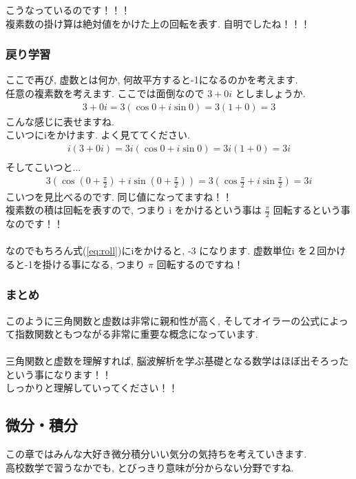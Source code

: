 \documentclass[11pt,a4paper]{jsarticle}
\begin{document}
こうなっているのです！！！\\
複素数の掛け算は絶対値をかけた上の回転を表す. 自明でしたね！！！
\subsubsection{戻り学習}
ここで再び, 虚数とは何か, 何故平方すると-1になるのかを考えます.\\
任意の複素数を考えます. ここでは面倒なので $ 3 + 0i$ としましょうか.
\begin{eqnarray}
3 + 0i = 3(\cos 0 + i\sin 0) = 3(1 + 0) = 3
\end{eqnarray}
こんな感じに表せますね.\\
こいつにiをかけます. よく見ててください.
\begin{eqnarray}
i(3 + 0i) = 3i(\cos 0 + i\sin 0) = 3i(1+0) = 3i\\
\end{eqnarray}
そしてこいつと...
\begin{eqnarray}
3(\cos (0+\frac{\pi}{2}) + i\sin (0 + \frac{\pi}{2})) = 3(\cos\frac{\pi}{2} + i\sin\frac{\pi}{2}) = 3i
\label{eq:roll}
\end{eqnarray}
こいつを見比べるのです. 同じ値になってますね！！\\
複素数の積は回転を表すので, つまり i をかけるという事は $\frac{\pi}{2}$ 回転するという事なのです！！\\
\\
なのでもちろん式(\ref{eq:roll})にiをかけると, -3 になります. 虚数単位i を２回かけると-1を掛ける事になる, つまり $\pi$ 回転するのですね！\\
\subsubsection{まとめ}
このように三角関数と虚数は非常に親和性が高く, そしてオイラーの公式によって指数関数ともつながる非常に重要な概念になっています. \\
\\
三角関数と虚数を理解すれば, 脳波解析を学ぶ基礎となる数学はほぼ出そろったという事になります！！\\
しっかりと理解していってください！！\\

\subsection{微分・積分}
この章ではみんな大好き微分積分いい気分の気持ちを考えていきます.\\
高校数学で習うなかでも, とびっきり意味が分からない分野ですね.\\
\end{document}
